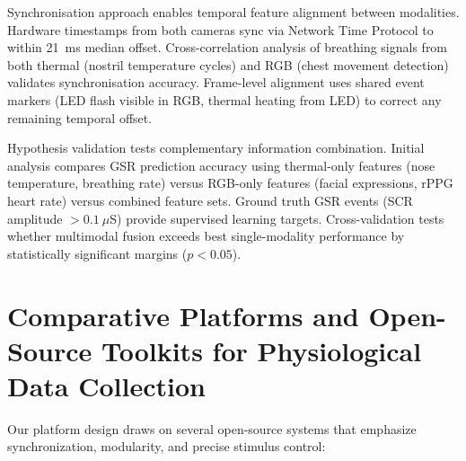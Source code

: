 \documentclass{report}
\begin{document}
    Synchronisation approach enables temporal feature alignment between modalities. Hardware timestamps from both cameras sync via Network Time Protocol to within 21~ms median offset. Cross-correlation analysis of breathing signals from both thermal (nostril temperature cycles) and RGB (chest movement detection) validates synchronisation accuracy. Frame-level alignment uses shared event markers (LED flash visible in RGB, thermal heating from LED) to correct any remaining temporal offset.

    Hypothesis validation tests complementary information combination. Initial analysis compares GSR prediction accuracy using thermal-only features (nose temperature, breathing rate) versus RGB-only features (facial expressions, rPPG heart rate) versus combined feature sets. Ground truth GSR events (SCR amplitude $>0.1~\mu$S) provide supervised learning targets. Cross-validation tests whether multimodal fusion exceeds best single-modality performance by statistically significant margins ($p < 0.05$).

    \section{Comparative Platforms and Open-Source Toolkits for Physiological Data Collection}
    \label{sec:platforms}

    Our platform design draws on several open-source systems that emphasize synchronization, modularity, and precise stimulus control:
\end{document}

